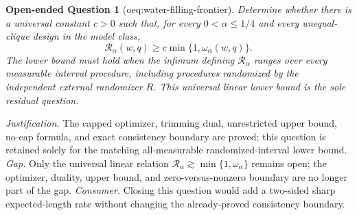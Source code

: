\documentclass{article}
\newtheorem{openendedquestion}{Open-ended Question}
\begin{document}
\begin{openendedquestion}[oeq:water-filling-frontier]\label{oeq:water-filling-frontier}
Determine whether there is a universal constant \(c>0\) such that, for every \(0<\alpha\le1/4\) and every unequal-clique design in the model class,
\[
 \mathcal R_\alpha(w,q)\ge c\min\{1,\omega_\alpha(w,q)\}.
\]
The lower bound must hold when the infimum defining \(\mathcal R_\alpha\) ranges over every measurable interval procedure, including procedures randomized by the independent external randomizer \(R\). This universal linear lower bound is the sole residual question.
\end{openendedquestion}
\par\smallskip\noindent \textit{Justification.} The capped optimizer, trimming dual, unrestricted upper bound, no-cap formula, and exact consistency boundary are proved; this question is retained solely for the matching all-measurable randomized-interval lower bound. \textit{Gap.} Only the universal linear relation \(\mathcal R_\alpha\gtrsim\min\{1,\omega_\alpha\}\) remains open; the optimizer, duality, upper bound, and zero-versus-nonzero boundary are no longer part of the gap. \textit{Consumer.} Closing this question would add a two-sided sharp expected-length rate without changing the already-proved consistency boundary.
\end{document}
